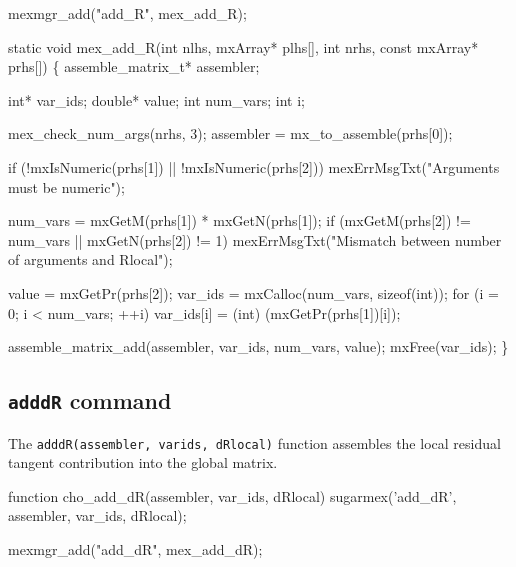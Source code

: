 \nwenddocs{}\plusendmoddef
mexmgr_add("add_R", mex_add_R);
\nwendcode{}\nwdocspar

\nwenddocs{}\plusendmoddef
static void mex_add_R(int nlhs, mxArray* plhs[],
                      int nrhs, const mxArray* prhs[])
\{
    assemble_matrix_t* assembler;

    int*    var_ids;
    double* value;
    int     num_vars;
    int     i;

    mex_check_num_args(nrhs, 3);
    assembler = mx_to_assemble(prhs[0]);

    if (!mxIsNumeric(prhs[1]) || !mxIsNumeric(prhs[2]))
        mexErrMsgTxt("Arguments must be numeric");

    num_vars  = mxGetM(prhs[1]) * mxGetN(prhs[1]);
    if (mxGetM(prhs[2]) != num_vars || mxGetN(prhs[2]) != 1)
        mexErrMsgTxt("Mismatch between number of arguments and Rlocal");

    value     = mxGetPr(prhs[2]);
    var_ids   = mxCalloc(num_vars, sizeof(int));
    for (i = 0; i < num_vars; ++i)
        var_ids[i] = (int) (mxGetPr(prhs[1])[i]);

    assemble_matrix_add(assembler, var_ids, num_vars, value);
    mxFree(var_ids);
\}

\nwendcode{}\nwdocspar


\subsection{{\tt{}add{}dR} command}

The {\tt{}add{}dR(assembler,\ var{}ids,\ dRlocal)} function assembles the local
residual tangent contribution into the global matrix.

\nwenddocs{}\endmoddef
function cho_add_dR(assembler, var_ids, dRlocal)
sugarmex('add_dR', assembler, var_ids, dRlocal);
\nwendcode{}\nwdocspar

\nwenddocs{}\plusendmoddef
mexmgr_add("add_dR", mex_add_dR);
\nwendcode{}\nwdocspar

